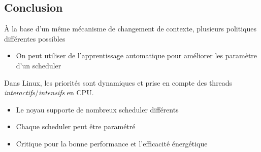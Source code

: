 \subsection{Conclusion}\label{conclusion}

À la base d'un même mécanisme de changement de contexte, plusieurs
politiques différentes possibles

\begin{itemize}
\tightlist
\item
  On peut utiliser de l'apprentissage automatique pour améliorer les
  paramètre d'un scheduler
\end{itemize}

Dans Linux, les priorités sont dynamiques et prise en compte des threads
\emph{interactifs}/\emph{intensifs} en CPU.

\begin{itemize}
\tightlist
\item
  Le noyau supporte de nombreux scheduler différents
\item
  Chaque scheduler peut être paramétré
\item
  Critique pour la bonne performance et l'efficacité énergétique
\end{itemize}

